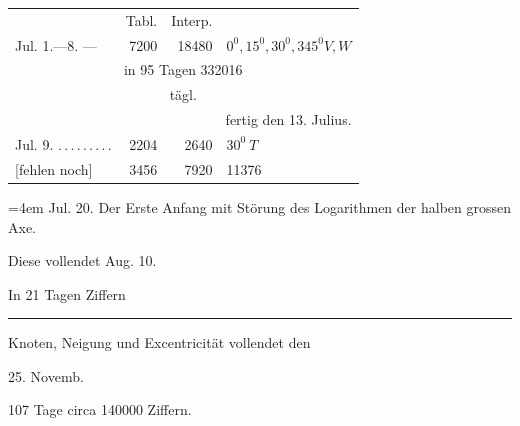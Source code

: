 \begin{center}
\begin{tabular}{@{}p{.32\linewidth}rrl@{}}
&Tabl.&Interp.&\\
Jul. 1.—8. \BJournalDay{☿}—\BJournalDay{☿}&7200&18480&\(\mathit{0}^0,\mathit{15}^0,\mathit{30}^0,\mathit{345}^0 V,W\)\\
\multicolumn{4}{c}{in 95 Tagen 332016}\\
\multicolumn{4}{c}{tägl.\qquad 3495}\\
\multicolumn{4}{r}{fertig den 13. Julius.}\\
Jul. 9. \BJournalDay{♃}\nobreak\hspace{.2em}\mbox{.\,.\,.\,.\,.\,.\,.\,.\,.}\hfill&2204&2640&\(\mathit{30}^0\ T\)\\
\hfill [fehlen noch]&3456&7920&11376\\
\hline
\end{tabular}
\end{center}
\noindent\hangindent=4em Jul. 20. Der Erste Anfang mit Störung des Logarithmen der halben grossen Axe.\par
\begin{center}
Diese vollendet Aug. 10. \par
In 21 Tagen Ziffern\par\smallskip
\rule{.25\linewidth}{.3pt}\par\smallskip
Knoten, Neigung und Excentricität vollendet den\par
25. Novemb. \par
107 Tage circa 140000 Ziffern.
\end{center}
\endgroup
\clearpage
\endgroup
